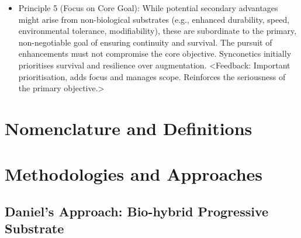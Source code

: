 \documentclass[10pt]{article}
\begin{document}
\begin{sloppypar}
\begin{itemize}
    \item Principle 5 (Focus on Core Goal): While potential secondary advantages might arise from non-biological substrates (e.g., enhanced durability, speed, environmental tolerance, modifiability), these are subordinate to the primary, non-negotiable goal of ensuring continuity and survival. The pursuit of enhancements must not compromise the core objective. Synconetics initially prioritises survival and resilience over augmentation. <Feedback: Important prioritisation, adds focus and manages scope. Reinforces the seriousness of the primary objective.>

  \end{itemize}


  \section{Nomenclature and Definitions}
  \label{sec:nomenclature}



  \section{Methodologies and Approaches}
  \label{sec:methodologies}


  \subsection{Daniel's Approach: Bio-hybrid Progressive Substrate}
  \label{sec:daniel-approach}


\end{sloppypar}
\end{document}
